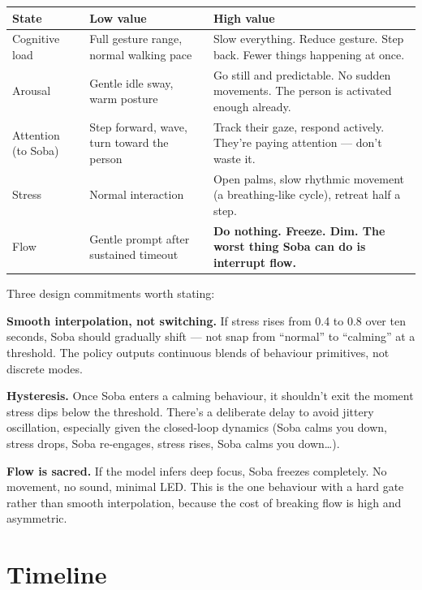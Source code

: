 \documentclass[11pt,a4paper]{article}
\begin{document}
\begin{table}[H]
\centering\small
\begin{tabularx}{\textwidth}{lXX}
\toprule
\textbf{State} & \textbf{Low value} & \textbf{High value} \\
\midrule
Cognitive load & Full gesture range, normal walking pace & Slow everything. Reduce gesture. Step back. Fewer things happening at once. \\
Arousal & Gentle idle sway, warm posture & Go still and predictable. No sudden movements. The person is activated enough already. \\
Attention (to Soba) & Step forward, wave, turn toward the person & Track their gaze, respond actively. They're paying attention --- don't waste it. \\
Stress & Normal interaction & Open palms, slow rhythmic movement (a breathing-like cycle), retreat half a step. \\
Flow & Gentle prompt after sustained timeout & \textbf{Do nothing. Freeze. Dim. The worst thing Soba can do is interrupt flow.} \\
\bottomrule
\end{tabularx}
\end{table}

Three design commitments worth stating:

\textbf{Smooth interpolation, not switching.} If stress rises from 0.4 to 0.8 over ten seconds, Soba should gradually shift --- not snap from ``normal'' to ``calming'' at a threshold. The policy outputs continuous blends of behaviour primitives, not discrete modes.

\textbf{Hysteresis.} Once Soba enters a calming behaviour, it shouldn't exit the moment stress dips below the threshold. There's a deliberate delay to avoid jittery oscillation, especially given the closed-loop dynamics (Soba calms you down, stress drops, Soba re-engages, stress rises, Soba calms you down\ldots).

\textbf{Flow is sacred.} If the model infers deep focus, Soba freezes completely. No movement, no sound, minimal LED. This is the one behaviour with a hard gate rather than smooth interpolation, because the cost of breaking flow is high and asymmetric.

\section{Timeline}
\end{document}
